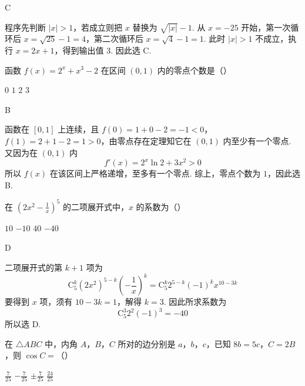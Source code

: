 \begin{answer}
C
\end{answer}

\begin{solution}
程序先判断 \(|x|>1\)，若成立则把 \(x\) 替换为 \(\sqrt{|x|}-1\). 从 \(x=-25\) 开始，第一次循环后 \(x=\sqrt{25}-1=4\)，第二次循环后 \(x=\sqrt4-1=1\). 此时 \(|x|>1\) 不成立，执行 \(x=2x+1\)，得到输出值 \(3\). 因此选 C.
\end{solution}

\begin{problem}
函数 \( f(x) = 2^x + x^3 - 2 \) 在区间 \((0,1)\) 内的零点个数是（\quad）

\choices
    {\(0\)}
    {\(1\)}
    {\(2\)}
    {\(3\)}
\end{problem}

\begin{answer}
B
\end{answer}

\begin{solution}
函数在 \([0,1]\) 上连续，且 \(f(0)=1+0-2=-1<0\)，\(f(1)=2+1-2=1>0\)，由零点存在定理知它在 \((0,1)\) 内至少有一个零点. 又因为在 \((0,1)\) 内
\[
f'(x)=2^x\ln2+3x^2>0
\]
所以 \(f(x)\) 在该区间上严格递增，至多有一个零点. 综上，零点个数为 \(1\)，因此选 B.
\end{solution}

\begin{problem}
在 \(\left(2x^{2} - \frac{1}{x}\right)^{5}\) 的二项展开式中，\(x\) 的系数为（\quad）

\choices
    {\(10\)}
    {\(-10\)}
    {\(40\)}
    {\(-40\)}
\end{problem}

\begin{answer}
D
\end{answer}

\begin{solution}
二项展开式的第 \(k+1\) 项为
\[
\mathrm C_5^k(2x^2)^{5-k}\left(-\frac1x\right)^k=\mathrm C_5^k2^{5-k}(-1)^k x^{10-3k}
\]
要得到 \(x\) 项，须有 \(10-3k=1\)，解得 \(k=3\). 因此所求系数为
\[
\mathrm C_5^3 2^2(-1)^3=-40
\]
所以选 D.
\end{solution}

\begin{problem}
在 \(\triangle ABC\) 中，内角 \(A\)，\(B\)，\(C\) 所对的边分别是 \(a\)，\(b\)，\(c\)，已知 \(8b = 5c\)，\(C = 2B\)，则 \(\cos C =\)（\quad）

\choices
    {\(\frac{7}{25}\)}
    {\( -\frac{7}{25} \)}
    {\(\pm\frac{7}{25}\)}
    {\(\frac{24}{25}\)}
\end{problem}

